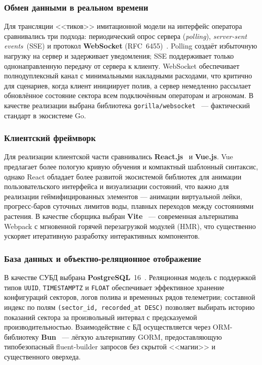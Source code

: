\subsubsection{Обмен данными в реальном времени}

Для трансляции <<тиков>> имитационной модели на интерфейс оператора
сравнивались три подхода: периодический опрос сервера
(\emph{polling}), \emph{server-sent events}~(SSE) и протокол
\textbf{WebSocket} (RFC~6455)~\cite{rfc6455_ietf,mdn_websocket}.
Polling создаёт избыточную нагрузку на сервер и задерживает
уведомления; SSE поддерживает только однонаправленную передачу от
сервера к клиенту. WebSocket обеспечивает полнодуплексный канал с
минимальными накладными расходами, что критично для сценариев, когда
клиент инициирует полив, а сервер немедленно рассылает обновлённое
состояние сектора всем подключённым операторам и агрономам. В качестве
реализации выбрана библиотека
\texttt{gorilla/websocket}~\cite{gorilla_websocket_github,gorilla_websocket_pkgdev}
--- фактический стандарт в экосистеме Go.

\subsubsection{Клиентский фреймворк}

Для реализации клиентской части сравнивались
\textbf{React.js}~\cite{react_official,react_reference_hooks} и
\textbf{Vue.js}. Vue предлагает более пологую кривую обучения и
компактный шаблонный синтаксис, однако React обладает более развитой
экосистемой библиотек для анимации пользовательского интерфейса и
визуализации состояний, что важно для реализации геймифицированных
элементов --- анимации виртуальной лейки, прогресс-баров суточных
лимитов воды, плавных переходов между состояниями растения.
В качестве сборщика выбран \textbf{Vite}~\cite{vite_official,vite_guide}
--- современная альтернатива Webpack с мгновенной горячей перезагрузкой
модулей (HMR), что существенно ускоряет итеративную разработку
интерактивных компонентов.

\subsubsection{База данных и объектно-реляционное отображение}

В качестве СУБД выбрана
\textbf{PostgreSQL}~16~\cite{postgresql_official,postgresql_16_release_notes}.
Реляционная модель с поддержкой типов \texttt{UUID}, \texttt{TIMESTAMPTZ}
и \texttt{FLOAT} обеспечивает эффективное хранение конфигураций
секторов, логов полива и временных рядов телеметрии; составной индекс
по полям \texttt{(sector\_id, recorded\_at~DESC)} позволяет выбирать
историю показаний сектора за произвольный интервал с предсказуемой
производительностью. Взаимодействие с БД осуществляется через
ORM-библиотеку \textbf{Bun}~\cite{bun_uptrace_official,bun_github} ---
лёгкую альтернативу GORM, предоставляющую типобезопасный fluent-builder
запросов без скрытой <<магии>> и существенного оверхеда.

